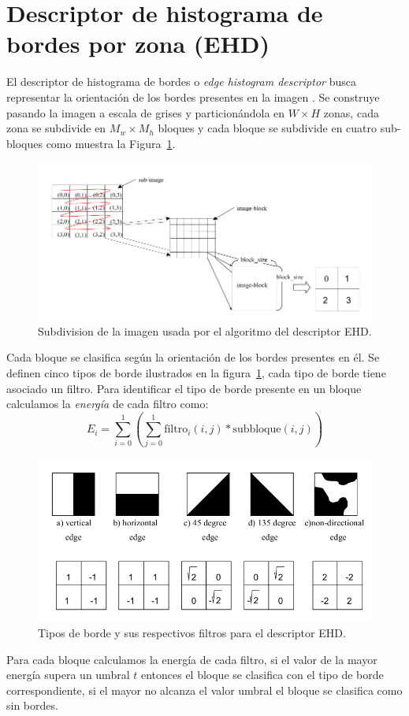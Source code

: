 \section{Descriptor de histograma de bordes por zona (EHD)}\label{ehd}
El descriptor de histograma de bordes o \emph{edge histogram descriptor} busca representar la orientación de los bordes presentes en la imagen \cite{ParkJW00:ehd, Manjunath:desc}. Se construye pasando la imagen a escala de grises y particionándola en $W \times H$ zonas, cada zona se subdivide en $M_w \times M_h$ bloques y cada bloque se subdivide en cuatro sub-bloques como muestra la Figura~\ref{ehd_blocks}. 
    \begin{figure}[!h]
		\centering
		\includegraphics[scale=0.45]{imagenes/cap3/ehd_blocks.png}
		\caption{Subdivision de la imagen usada por el algoritmo del descriptor EHD.}
		\label{ehd_blocks}
	\end{figure}
Cada bloque se clasifica según la orientación de los bordes presentes en él. Se definen cinco tipos de borde ilustrados en la figura~\ref{ehd_blocks}, cada tipo de borde tiene asociado un filtro. Para identificar el tipo de borde presente en un bloque calculamos la \emph{energía} de cada filtro como: 
\begin{equation*}
E_i =  \displaystyle\sum_{i=0}^{1} \left(\displaystyle\sum_{j=0}^{1} \text{filtro}_i(i,j) * \text{subbloque}(i,j)\right)
\end{equation*}

    \begin{figure}[!h]
		\centering
		\includegraphics[scale=0.45]{imagenes/cap3/ehd_filters.png}
		\caption{Tipos de borde y sus respectivos filtros para el descriptor EHD.}
		\label{ehd_filters}
	\end{figure}
Para cada bloque calculamos la energía de cada filtro, si el valor de la mayor energía supera un umbral $t$ entonces el bloque se clasifica con el tipo de borde correspondiente, si el mayor no alcanza el valor umbral el bloque se clasifica como sin bordes.

